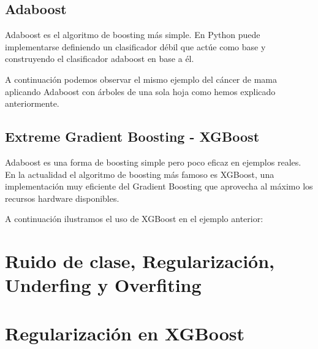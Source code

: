 \subsection{Adaboost}

Adaboost es el algoritmo de boosting más simple.  
En Python puede implementarse definiendo un clasificador débil que actúe como base y construyendo el clasificador adaboost en base a él.  

A continuación podemos observar el mismo ejemplo del cáncer de mama aplicando Adaboost con árboles de una sola hoja como hemos explicado anteriormente.

\subsection{Extreme Gradient Boosting - XGBoost}
Adaboost es una forma de boosting simple pero poco eficaz en ejemplos reales.  
En la actualidad el algoritmo de boosting más famoso es XGBoost, una implementación muy eficiente del Gradient Boosting que aprovecha al máximo los recursos hardware disponibles.  

A continuación ilustramos el uso de XGBoost en el ejemplo anterior:

\section{Ruido de clase, Regularización, Underfing y Overfiting}



\section{Regularización en XGBoost}
















































